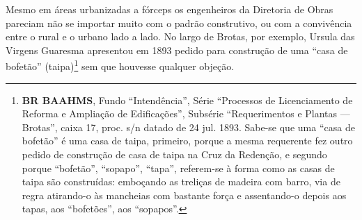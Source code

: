Mesmo em áreas urbanizadas a fórceps os engenheiros da Diretoria de Obras pareciam não se importar muito com o padrão construtivo, ou com a convivência entre o rural e o urbano lado a lado. No largo de Brotas, por exemplo, Ursula das Virgens Guaresma apresentou em 1893 pedido para construção de uma ``casa de bofetão'' (taipa)\footnote{\textbf{BR BAAHMS}, Fundo ``Intendência'', Série ``Processos de Licenciamento de Reforma e Ampliação de Edificações'', Subsérie ``Requerimentos e Plantas --- Brotas'', caixa 17, proc. s/n datado de 24 jul. 1893. Sabe-se que uma ``casa de bofetão'' é uma casa de taipa, primeiro, porque a mesma requerente fez outro pedido de construção de casa de taipa na Cruz da Redenção, e segundo porque ``bofetão'', ``sopapo'', ``tapa'', referem-se à forma como as casas de taipa são construídas: emboçando as treliças de madeira com barro, via de regra atirando-o às mancheias com bastante força e assentando-o depois aos tapas, aos ``bofetões'', aos ``sopapos''.} sem que houvesse qualquer objeção.  


